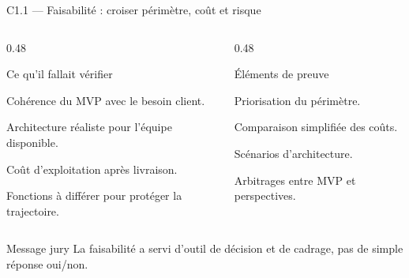 
\begin{frame}{C1.1 — Faisabilité : croiser périmètre, coût et risque}
\begin{columns}[T]
\begin{column}{0.48\linewidth}
\begin{block}{Ce qu'il fallait vérifier}
\begin{tightitems}
  \item Cohérence du MVP avec le besoin client.
  \item Architecture réaliste pour l'équipe disponible.
  \item Coût d'exploitation après livraison.
  \item Fonctions à différer pour protéger la trajectoire.
\end{tightitems}
\end{block}
\end{column}
\begin{column}{0.48\linewidth}
\begin{block}{Éléments de preuve}
\begin{tightitems}
  \item Priorisation du périmètre.
  \item Comparaison simplifiée des coûts.
  \item Scénarios d'architecture.
  \item Arbitrages entre MVP et perspectives.
\end{tightitems}
\end{block}
\end{column}
\end{columns}
\begin{block}{Message jury}
La faisabilité a servi d'outil de décision et de cadrage, pas de simple réponse oui/non.
\end{block}
\end{frame}

